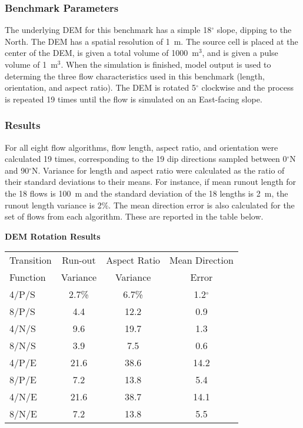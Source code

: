 		\subsubsection{Benchmark Parameters} The underlying DEM for this benchmark has a simple 18$^{\circ}$ slope, dipping to the North. The DEM has a spatial resolution of 1~m. The source cell is placed at the center of the DEM, is given a total volume of 1000~m$^3$, and is given a pulse volume of 1~m$^3$. When the simulation is finished, model output is used to determing the three flow characteristics used in this benchmark (length, orientation, and aspect ratio). The DEM is rotated 5$^{\circ}$ clockwise and the process is repeated 19 times until the flow is simulated on an East-facing slope.
		
		
		
		\subsubsection{Results}

		For all eight flow algorithms, flow length, aspect ratio, and orientation were calculated 19 times, corresponding to the 19 dip directions sampled between 0$^{\circ}$N and 90$^{\circ}$N. Variance for length and aspect ratio were calculated as the ratio of their standard deviations to their means. For instance, if mean runout length for the 18 flows is 100~m and the standard deviation of the 18 lengths is 2~m, the runout length variance is 2\%. The mean direction error is also calculated for the set of flows from each algorithm. These are reported in the table below.

			\begin{center}
				\textbf{DEM Rotation Results}
				
				\begin{tabular}{l c c c}
					\toprule
					Transition&Run-out&Aspect Ratio&Mean Direction\\
					Function&Variance&Variance&Error\\
					\midrule
					4/P/S &2.7\%&6.7\%&1.2$^{\circ}$\\
					8/P/S &4.4&12.2&0.9\\
					4/N/S &9.6&19.7&1.3\\
					8/N/S &3.9&7.5&0.6\\
					4/P/E &21.6&38.6&14.2\\
					8/P/E &7.2&13.8&5.4\\
					4/N/E &21.6&38.7&14.1\\
					8/N/E &7.2&13.8&5.5\\
			
					\bottomrule
				\end{tabular}
			\end{center}

